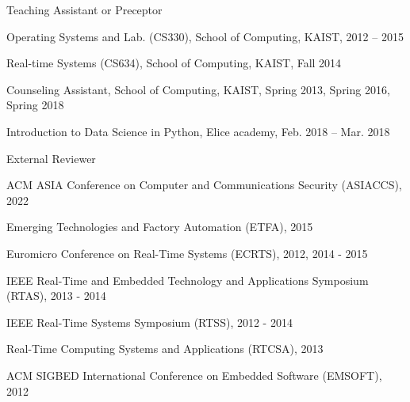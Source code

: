 \documentclass[11pt,letterpaper]{article}
\begin{document}
\begin{envtime}[]{Teaching Assistant or Preceptor}{}
	\item{Operating Systems and Lab. (CS330), School of Computing, KAIST}{, 2012 -- 2015}
	\item{Real-time Systems (CS634), School of Computing, KAIST}{, Fall 2014}
	\item{Counseling Assistant, School of Computing, KAIST}{, Spring 2013, Spring 2016, Spring 2018}
	\item{Introduction to Data Science in Python, Elice academy}{, Feb. 2018 -- Mar. 2018}
\end{envtime}


\begin{envtime}[]{External Reviewer}{}
	\item{ACM ASIA Conference on Computer and Communications Security (ASIACCS)}{, 2022}
	\item{Emerging Technologies and Factory Automation (ETFA)}{, 2015}
	\item{Euromicro Conference on Real-Time Systems (ECRTS)}{, 2012, 2014 - 2015}
	\item{IEEE Real-Time and Embedded Technology and Applications Symposium (RTAS)}{, 2013 - 2014}
	\item{IEEE Real-Time Systems Symposium (RTSS)}{, 2012 - 2014}
	\item{Real-Time Computing Systems and Applications (RTCSA)}{, 2013}
	\item{ACM SIGBED International Conference on Embedded Software (EMSOFT)}{, 2012}





						
\end{envtime}
\end{document}
